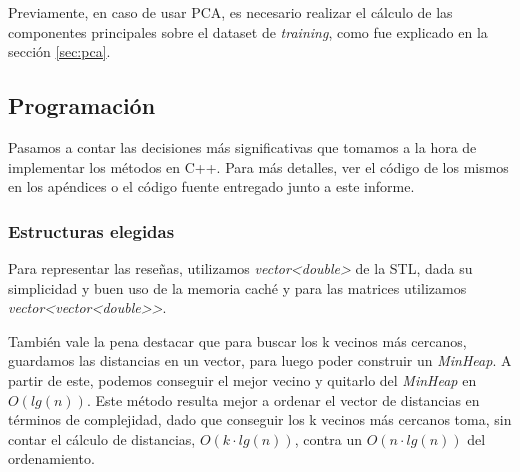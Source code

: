 Previamente, en caso de usar PCA, es necesario realizar el cálculo de las
componentes principales sobre el dataset de \textit{training},
como fue explicado en la sección \ref{sec:pca}.



\subsection{Programación}
Pasamos a contar las decisiones más significativas que tomamos a la hora de implementar los métodos en C++. Para más detalles, ver el código de los mismos en los apéndices o  el código fuente entregado junto a este informe.

\subsubsection{Estructuras elegidas}
Para representar las reseñas, utilizamos \textit{vector<double>} de la STL, dada su simplicidad y buen uso de la memoria caché y para las matrices utilizamos \textit{vector<vector<double>\null>}.

También vale la pena destacar que para buscar los k vecinos más cercanos, guardamos las distancias en un vector, para luego poder construir un \textit{MinHeap}. A partir de este, podemos conseguir el mejor vecino y quitarlo del \textit{MinHeap} en $O(lg(n))$. Este método resulta mejor a ordenar el vector de distancias en términos de complejidad, dado que conseguir los k vecinos más cercanos toma, sin contar el cálculo de distancias, $O(k \cdot lg(n))$, contra un $O(n \cdot lg(n))$ del ordenamiento.

